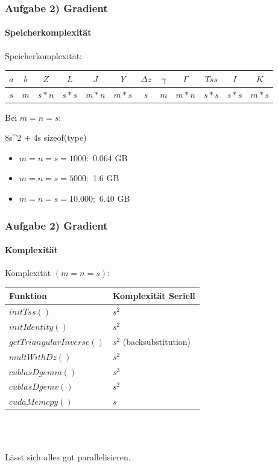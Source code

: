 \begin{frame}
	\frametitle{Aufgabe 2) Gradient}
	\framesubtitle{Speicherkomplexität}
	Speicherkomplexität: \\
	\begin{center}
		\begin{tabular}{ c | c | c | c | c | c | c | c | c | c | c | c }
			$a$ & $b$ & $Z$ & $L$ & $J$ & $Y$ & $\Delta z$ & $\gamma$ & $\Gamma$ & $Tss$ & $I$ & $K$\\
			\hline
			$s$ & $m$ & $s*n$ & $s*s$ & $m*n$ & $m*s$ & $s$ & $m$ & $m*n$& $s*s$ & $s*s$ & $m*s$\\
		\end{tabular}
	\end{center}
	Bei $m=n=s$:
	\begin{flalign*}
		8s^2 + 4s \times sizeof(type)
	\end{flalign*}
	\begin{itemize}
		\item $m=n=s=1000:$  0.064 GB
		\item $m=n=s=5000:$ 1.6 GB
		\item $m=n=s=10.000:$ 6.40 GB
	\end{itemize}
\end{frame}
\begin{frame}
	\frametitle{Aufgabe 2) Gradient}
	\framesubtitle{Komplexität}
	Komplexität $(m=n=s)$: \\
	\begin{center}
		\begin{tabular}{ l | l}
			Funktion & Komplexität Seriell \\
			\hline
			$initTss()$	& $s^2$\\
			$initIdentity()$& $s^2$ \\
			$getTriangularInverse()$& $s^2$ (backsubstitution)\\
			$multWithDz()$  & $s^2$  \\
			$cublasDgemm()$& $s^3$ \\
			$cublasDgemv()$ & $s^2$ \\
			$cudaMemcpy()$ & $s$ \\
		\end{tabular} 	\\~\\
	\end{center}
	\begin{center}
		Lässt sich alles gut parallelisieren.
	\end{center}
\end{frame}
